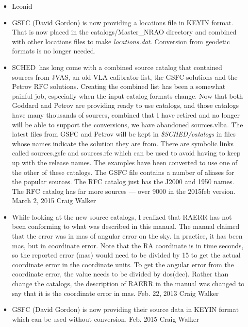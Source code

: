 \documentclass{report}
\newcommand{\schedb}{{\sc SCHED~}}
\begin{document}
\begin{itemize}

\item Leonid

\item GSFC (David Gordon) is now providing a locations file in 
KEYIN format.  That is now placed in the catalogs/Master\_NRAO directory
and combined with other locations files to make {\sl locations.dat}.
Conversion from geodetic formats is no longer needed.

\item \schedb has long come with a combined source catalog that contained
sources from JVAS, an old VLA calibrator list, the GSFC solutions and
the Petrov RFC solutions.  Creating the combined list has been a somewhat
painful job, especially when the input catalog formats change.  Now that
both Goddard and Petrov are providing ready to use catalogs, and those
catalogs have many thousands of sources, combined that I have retired
and no longer will be able to support the conversions, we have abandoned
sources.vlba.  The latest files from GSFC and Petrov will be kept in
{\sl \$SCHED/catalogs} in files whose names indicate the solution they 
are from.  There are symbolic links called sources.gsfc and sources.rfc
which can be used to avoid having to keep up with the release names.
The examples have been converted to use one of the other of these catalogs.
The GSFC file contains a number of aliases for the popular sources.
The RFC catalog just has the J2000 and 1950 names.  The RFC catalog has
far more sources --- over 9000 in the 2015feb version.
March 2, 2015  Craig Walker

\item While looking at the new source catalogs, I realized that RAERR
has not been conforming to what was described in this manual.  The manual
claimed that the error was in mas of angular error on the sky.  In 
practice, it has been mas, but in coordinate error.  Note that the 
RA coordinate is in time seconds, so the reported error (mas) would need
to be divided by 15 to get the actual coordinate error in the coordinate
units.  To get the angular error from the coordinate error, the value
needs to be divided by dos(dec).  Rather than change the catalogs, the
description of RAERR in the manual was changed to say that it is the
coordinate error in mas.  Feb. 22, 2013 Craig Walker

\item GSFC (David Gordon) is now providing their source data in KEYIN
format which can be used without conversion.  Feb. 2015  Craig Walker


\end{itemize}
\end{document}
